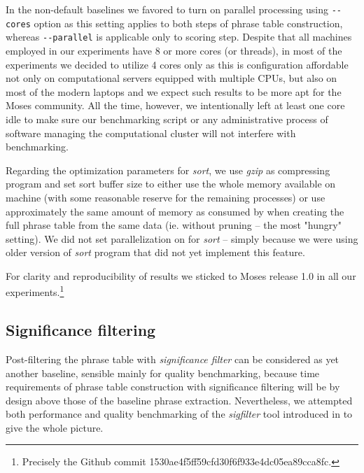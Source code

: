 In the non-default baselines we favored to turn on parallel processing using \verb|--cores|
option as this setting applies to both steps of phrase table construction, whereas
\verb|--parallel| is applicable only to scoring step.
Despite that all machines employed in our experiments have 8 or more cores (or threads),
in most of the experiments we decided to utilize 4 cores only as this is configuration
affordable not only on computational servers equipped with multiple CPUs, but also on most
of the modern laptops and we expect such results to be more apt for the Moses community.
All the time, however, we intentionally left at least one core idle to make sure our
benchmarking script or any administrative process of software managing the computational
cluster will not interfere with benchmarking.

Regarding the optimization parameters for \emph{sort}, we use \emph{gzip} as compressing
program and set sort buffer size to either use the whole memory available on machine
(with some reasonable reserve for the remaining processes) or use approximately the same
amount of memory as consumed by \eppex{} when creating the full phrase table from
the same data (ie. without pruning -- the most "hungry" setting).
We did not set parallelization on for \emph{sort} -- simply because we were using older
version of \emph{sort} program that did not yet implement this feature.

For clarity and reproducibility of results we sticked to Moses release 1.0 in all our 
experiments.\footnote{Precisely the Github commit 1530ae4f5ff59cfd30f6f933e4dc05ea89cca8fc.}

\subsection{Significance filtering}

Post-filtering the phrase table with \emph{significance filter} can be considered as yet
another baseline, sensible mainly for quality benchmarking, because time requirements
of phrase table construction with significance filtering will be by design above those of
the baseline phrase extraction.
Nevertheless, we attempted both performance and quality benchmarking of the \emph{sigfilter}
tool introduced in  to give the whole picture.

